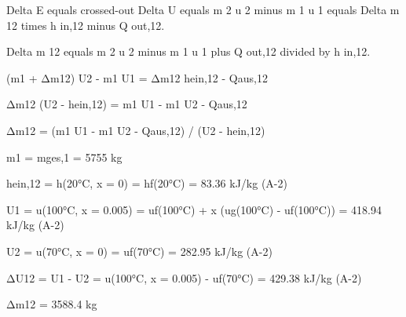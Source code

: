 Delta E equals crossed-out Delta U equals m 2 u 2 minus m 1 u 1 equals Delta m 12 times h in,12 minus Q out,12.  

Delta m 12 equals m 2 u 2 minus m 1 u 1 plus Q out,12 divided by h in,12.

(m1 + Δm12) U2 - m1 U1 = Δm12 hein,12 - Qaus,12  

Δm12 (U2 - hein,12) = m1 U1 - m1 U2 - Qaus,12  

Δm12 = (m1 U1 - m1 U2 - Qaus,12) / (U2 - hein,12)  

m1 = mges,1 = 5755 kg  

hein,12 = h(20°C, x = 0) = hf(20°C) = 83.36 kJ/kg (A-2)  

U1 = u(100°C, x = 0.005) = uf(100°C) + x (ug(100°C) - uf(100°C)) = 418.94 kJ/kg (A-2)  

U2 = u(70°C, x = 0) = uf(70°C) = 282.95 kJ/kg (A-2)  

ΔU12 = U1 - U2 = u(100°C, x = 0.005) - uf(70°C) = 429.38 kJ/kg (A-2)  

Δm12 = 3588.4 kg